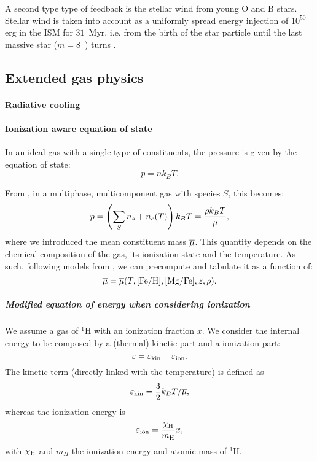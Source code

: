 A second type type of feedback is the stellar wind from young O and B stars.
Stellar wind is taken into account as a uniformly spread energy injection of $10^{50}$ erg in the ISM for $31$~Myr, i.e. from the birth of the star particle until the last massive star ($m = 8$~\Msun) turns \snii{}.



\subsection{Extended gas physics}
\label{sec:extended_gas_physics}
\paragraph{Radiative cooling}
\citep{DeRijcke2013}
\paragraph{Ionization aware equation of state}
In an ideal gas with a single type of constituents, the pressure is given by the equation of state:
\begin{equation}
p = n k_B T.
\end{equation}

From \citep[p. 161]{Vandenbroucke2016}, in a multiphase, multicomponent gas with species $S$, this becomes:
\begin{equation}
p = \left(\sum_S n_s + n_e(T)\right) k_BT =\frac{\rho k_B T}{\overline{\mu}},
\end{equation}
where we introduced the mean constituent mass $\overline{\mu}$.
This quantity depends on the chemical composition of the gas, its ionization state and the temperature.
As such, following models from \citet{DeRijcke2013}, we can precompute and tabulate it as a function of:
\[\overline{\mu} = \overline{\mu}(T, [\text{Fe}/\text{H}], [\text{Mg}/\text{Fe}], z, \rho).\]

\subparagraph{Modified equation of energy when considering ionization}
We assume a gas of ${}^1$H with an ionization fraction $x$.
We consider the internal energy to be composed by a (thermal) kinetic part and a ionization part:
\begin{equation}
\label{eq:energy}
\varepsilon = \varepsilon_\text{kin} + \varepsilon_\text{ion}.
\end{equation}
The kinetic term (directly linked with the temperature) is defined as
\begin{equation}
\varepsilon_\text{kin} = \frac 3 2 k_B T/ \overline{\mu},
\end{equation}
whereas the ionization energy is
\begin{equation}
\label{eq:energy_ion}
\varepsilon_\text{ion} = \dfrac{\chi_\text H}{m_\text H} x,
\end{equation}
with $\chi_\text H$ and $m_H$ the ionization energy and atomic mass of ${}^1$H.

